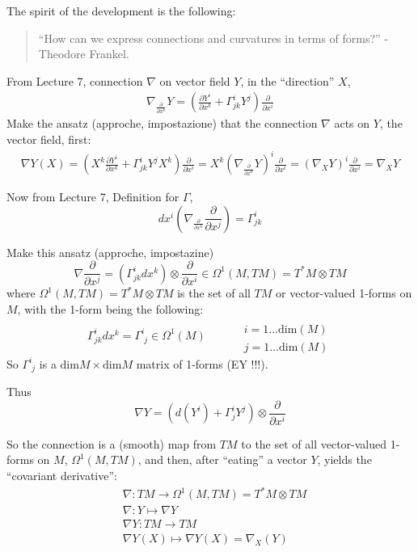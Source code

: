 \documentclass[10pt]{amsart}
\begin{document}
\begin{multicols*}{2}
	The spirit of the development is the following:
	\begin{quote}
		``How can we express connections and curvatures in terms of forms?'' -Theodore Frankel.  
	\end{quote}
	
	From Lecture 7, connection $\nabla$ on vector field $Y$, in the ``direction'' $X$,
	\[
	\begin{gathered}
	\nabla_{ \frac{ \partial }{ \partial x^k } } Y = \left( \frac{ \partial Y^i }{ \partial x^k } + \Gamma^i_{jk} Y^j  \right) \frac{ \partial }{ \partial x^i }
	\end{gathered}
	\]
	Make the ansatz (approche, impostazione) that the connection $\nabla$ acts on $Y$, the vector field, first:
	\[
	\begin{gathered}
	\nabla Y(X) = \left( X^k \frac{ \partial Y^i}{ \partial x^k} + \Gamma^i_{jk} Y^j X^k \right) \frac{ \partial}{ \partial x^i } = X^k \left( \nabla_{ \frac{ \partial }{ \partial x^k} } Y \right)^i \frac{ \partial }{ \partial x^i} = (\nabla_X Y)^i \frac{ \partial}{ \partial x^i} = \nabla_XY
	\end{gathered}
	\]
	
	Now from Lecture 7, Definition for $\Gamma$, 
	\[
	dx^i \left( \nabla_{ \frac{  \partial }{ \partial x^k } } \frac{ \partial }{ \partial x^j } \right) = \Gamma^i_{jk}
	\]
	
	Make this ansatz (approche, impostazine)
	\[
	\nabla \frac{ \partial}{ \partial x^j } = \left( \Gamma^i_{jk} dx^k \right) \otimes \frac{ \partial }{ \partial x^i} \in \Omega^1(M,TM) = T^*M \otimes TM
	\]
	where $\Omega^1(M,TM) = T^*M \otimes TM$ is the set of all $TM$ or vector-valued 1-forms on $M$, with the 1-form being the following:
	\[
	\Gamma^i_{jk} dx^k = \Gamma^i_{ \, \, j } \in \Omega^1(M) \quad \quad \, \begin{aligned}
	& \quad \\
	& i = 1 \dots \text{dim}(M) \\ 
	& j = 1\dots \text{dim}(M) \end{aligned}
	\]
	So $\Gamma^i_{ \, \, j}$ is a $\text{dim}M \times \text{dim}M$ matrix of 1-forms (EY !!!). 
	
	Thus
	\[
	\nabla Y = (d(Y^i) + \Gamma^i_j Y^j ) \otimes \frac{ \partial }{ \partial x^i}
	\]
	
	So the connection is a (smooth) map from $TM$ to the set of all vector-valued 1-forms on $M$, $\Omega^1(M,TM)$, and then, after ``eating'' a vector $Y$, yields the ``covariant derivative'':
	\[
	\begin{aligned}
	& \nabla: TM \to \Omega^1(M,TM) = T^*M \otimes TM \\ 
	& \nabla : Y \mapsto \nabla Y \\ 
	& \nabla Y : TM \to TM \\
	& \nabla Y(X) \mapsto \nabla Y(X) = \nabla_X(Y)
	\end{aligned}
	\]
	

\end{multicols*}
\end{document}
